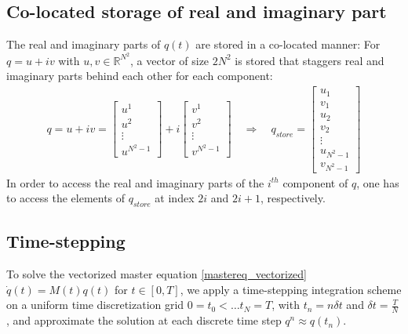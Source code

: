 \documentclass[letterpaper]{article}
\newcommand{\R}{\mathds{R}}
\begin{document}
  \subsection{Co-located storage of real and imaginary part}
  The real and imaginary parts of $q(t)$ are stored in a co-located manner: For $q = u+iv$ with $u,v\in\R^{N^2}$, a vector of size $2N^2$ is stored that staggers real and imaginary parts behind each other for each component:
  \begin{align*}
    q = u+iv = \begin{bmatrix}
     u^1\\u^2\\ \vdots \\ u^{N^2-1} 
    \end{bmatrix}
    + i \begin{bmatrix}
     v^1\\v^2\\ \vdots \\ v^{N^2-1} 
    \end{bmatrix}
    \quad \Rightarrow \quad
    q_{store} = \begin{bmatrix}
      u_1 \\ v_1\\ u_2 \\ v_2 \\ \vdots \\ u_{N^2-1} \\ v_{N^2-1}
    \end{bmatrix}
  \end{align*}
  In order to access the real and imaginary parts of the $i^{th}$ component of $q$, one has to access the elements of $q_{store}$ at index $2i$ and $2i+1$, respectively. 

  \subsection{Time-stepping}
    To solve the vectorized master equation \eqref{mastereq_vectorized} $\dot q(t) = M(t) q(t)$ for $t\in [0,T]$, we apply a time-stepping integration scheme on a uniform time discretization grid $0=t_0 < \dots t_{N} = T$, with $t_n = n \delta t$ and $\delta t = \frac{T}{N}$, and approximate the solution at each discrete time step $q^{n} \approx q(t_n)$.
   
\end{document}
